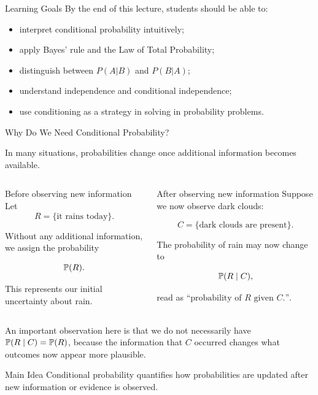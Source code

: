 \setcounter{framenumber}{0}

\begin{frame}
  \titlepage
\end{frame}

\begin{frame}{Learning Goals}
By the end of this lecture, students should be able to:

\begin{itemize}
    \item interpret conditional probability intuitively;
    \item apply Bayes' rule and the Law of Total Probability;
    \item distinguish between $P(A|B)$ and $P(B|A)$;
    \item understand independence and conditional independence;
    \item use conditioning as a strategy in solving in probability problems.
\end{itemize}
\end{frame}

\begin{frame}{Why Do We Need Conditional Probability?}

In many situations, probabilities change once additional information becomes available.

\begin{columns}[T]


\begin{block}{Before observing new information}
Let
\[
R=\{\text{it rains today}\}.
\]

Without any additional information, we assign the probability

\[
\mathbb{P}(R).
\]

This represents our initial uncertainty about rain.
\end{block}


\begin{block}{After observing new information}
Suppose we now observe dark clouds:

\[
C=\{\text{dark clouds are present}\}.
\]

The probability of rain may now change to

\[
\mathbb{P}(R\mid C),
\]

read as $\text{``probability of }R\text{ given }C\text{.''}$.
\end{block}

\end{columns}

An important observation here is that we do not necessarily have $\mathbb{P}(R\mid C)= \mathbb{P}(R)$, because the information that $C$ occurred changes what outcomes now appear more plausible.

\begin{keybox}{Main Idea}
Conditional probability quantifies how probabilities are updated after new information or evidence is observed.
\end{keybox}

\end{frame}

